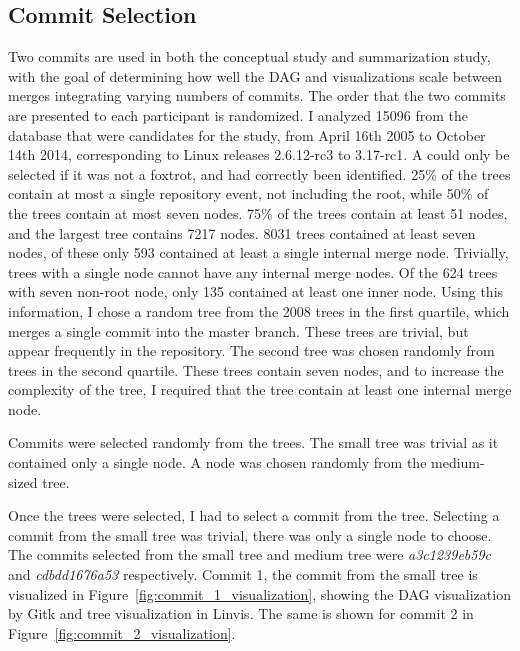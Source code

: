 \subsection{Commit Selection}\label{sub:commit_selection}

Two commits are used in both the conceptual study and summarization
study, with the goal of determining how well the DAG and \mt{}
visualizations scale between merges integrating varying numbers of
commits. The order that the two commits are presented to each
participant is randomized. I analyzed 15096  from the
database that were candidates for the study, from April 16th 2005 to
October 14th 2014, corresponding to Linux releases 2.6.12-rc3 to
3.17-rc1. A \mt{} could only be selected if it was not a foxtrot,
and had correctly been identified. 25\% of the trees contain at most a
single repository event, not including the root, while 50\% of the trees
contain at most seven nodes. 75\% of the trees contain at least 51
nodes, and the largest tree contains 7217 nodes. 8031 trees contained at
least seven nodes, of these only 593 contained at least a single
internal merge node. Trivially, trees with a single node cannot have any
internal merge nodes. Of the 624 trees with seven non-root node, only
135 contained at least one inner node. Using this information, I chose a
random tree from the 2008 trees in the first quartile, which merges a
single commit into the master branch. These trees are trivial, but
appear frequently in the repository. The second tree was chosen randomly
from trees in the second quartile. These trees contain seven nodes, and
to increase the complexity of the tree, I required that the tree contain
at least one internal merge node.

Commits were selected randomly from the trees.
The small tree was trivial as it contained only a single node.
A node was chosen randomly from the medium-sized tree.


Once the trees were selected, I had to select a commit from the tree.
Selecting a commit from the small tree was trivial, there was only a
single node to choose.
The commits selected from the small tree and medium tree were
\emph{a3c1239eb59c} and \emph{cdbdd1676a53} respectively.
Commit 1, the commit from the small tree is visualized in
Figure~\ref{fig:commit_1_visualization}, showing the DAG visualization
by Gitk and \rt{} tree visualization in Linvis.
The same is shown for commit 2 in
Figure~\ref{fig:commit_2_visualization}.

